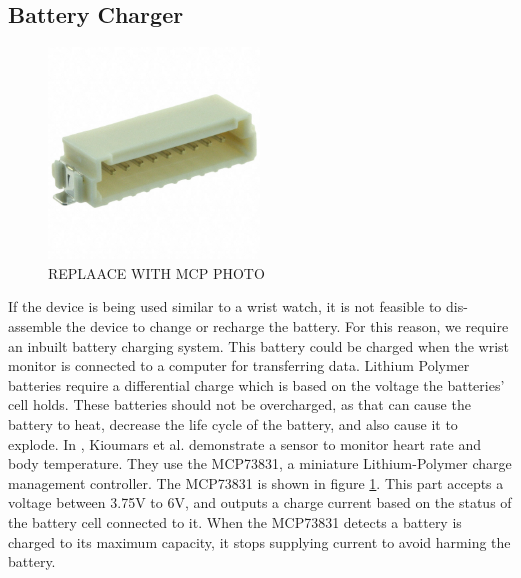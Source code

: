 \subsection{Battery Charger}
\label{Sec:BattCharger}
\begin{figure}
\begin{center}
\includegraphics[width=0.5\textwidth]{images/ConnectorWhole.JPG}
\caption{REPLAACE WITH MCP PHOTO}
\label{Fig:MCPCharger}
\end{center}
\end{figure}
If the device is being used similar to a wrist watch,
it is not feasible to dis-assemble the device to change or recharge the battery.
For this reason, 
we require an inbuilt battery charging system.
This battery could be charged when the wrist monitor is connected to a computer for transferring data.
Lithium Polymer batteries require a differential charge which is based on the voltage the batteries' cell holds.
These batteries should not be overcharged, 
as that can cause the battery to heat,
decrease the life cycle of the battery,
and also cause it to explode.
In \cite{kioumars2011atmega}, Kioumars et al. demonstrate a sensor to monitor heart rate and body temperature.
They use the MCP73831, a miniature Lithium-Polymer charge management controller.
The MCP73831 is shown in figure \ref{Fig:MCPCharger}.
This part accepts a voltage between 3.75V to 6V,
and outputs a charge current based on the status of the battery cell connected to it.
When the MCP73831 detects a battery is charged to its maximum capacity,
it stops supplying current to avoid harming the battery.

